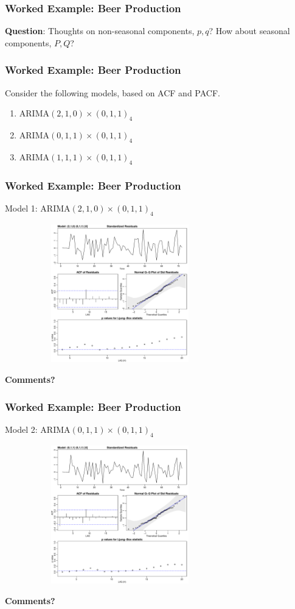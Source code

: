 \documentclass[%
xcolor=pdftex]{beamer}
\begin{document}
\begin{frame}
\frametitle{Worked Example: Beer Production}

\textbf{Question}: Thoughts on non-seasonal components, $p, q$? How about seasonal components, $P, Q$?
\end{frame}

\begin{frame}
\frametitle{Worked Example: Beer Production}

Consider the following models, based on ACF and PACF.

\begin{enumerate}
\item ARIMA$(2,1,0) \times (0,1,1)_4$
\item ARIMA$(0,1,1) \times (0,1,1)_4$
\item ARIMA$(1,1,1) \times (0,1,1)_4$
\end{enumerate}

\end{frame}

\begin{frame}
\frametitle{Worked Example: Beer Production}

Model 1: ARIMA$(2,1,0) \times (0,1,1)_4$

\includegraphics[width=100mm, height=60mm]{beer_m1.pdf}

\textbf{Comments?}
\end{frame}

\begin{frame}
\frametitle{Worked Example: Beer Production}

Model 2: ARIMA$(0,1,1) \times (0,1,1)_4$

\includegraphics[width=100mm, height=60mm]{beer_m2.pdf}

\textbf{Comments?}
\end{frame}
\end{document}
